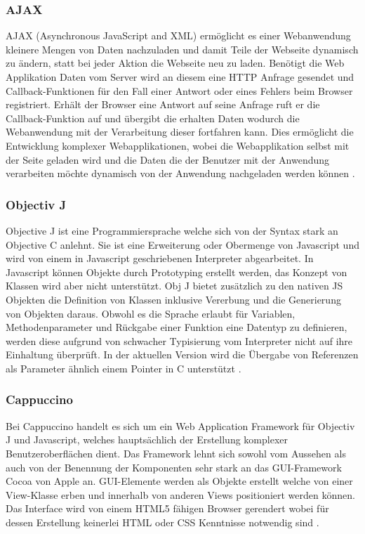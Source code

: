 \subsubsection{AJAX}
\label{sec:AJAX}
AJAX (Asynchronous JavaScript and XML) ermöglicht es einer Webanwendung kleinere Mengen von Daten nachzuladen und damit Teile der Webseite dynamisch zu ändern, 
statt bei jeder Aktion die Webseite neu zu laden.
Benötigt die Web Applikation Daten vom Server wird an diesem eine HTTP Anfrage gesendet und Callback-Funktionen für den Fall einer Antwort oder eines Fehlers beim Browser registriert.
Erhält der Browser eine Antwort auf seine Anfrage ruft er die Callback-Funktion auf und übergibt die erhalten Daten wodurch die Webanwendung mit der Verarbeitung dieser fortfahren kann.
Dies ermöglicht die Entwicklung komplexer Webapplikationen, 
wobei die Webapplikation selbst mit der Seite geladen wird und die Daten die der Benutzer mit der Anwendung verarbeiten möchte dynamisch von der Anwendung nachgeladen werden können \cite{ajax}.

\subsubsection{Objectiv J}
\label{sec:Objectiv J}

Objective J ist eine Programmiersprache welche sich von der Syntax stark an Objective C anlehnt.
Sie ist eine Erweiterung oder Obermenge von Javascript und wird von einem in Javascript geschriebenen Interpreter abgearbeitet.
In Javascript können Objekte durch Prototyping erstellt werden, das Konzept von Klassen wird aber nicht unterstützt.
Obj J bietet zusätzlich zu den nativen JS Objekten die Definition von Klassen inklusive Vererbung und die Generierung von Objekten daraus.
Obwohl es die Sprache erlaubt für Variablen, Methodenparameter und Rückgabe einer Funktion eine Datentyp zu definieren, 
werden diese aufgrund von schwacher Typisierung vom Interpreter nicht auf ihre Einhaltung überprüft.
In der aktuellen Version wird die Übergabe von Referenzen als Parameter ähnlich einem Pointer in C unterstützt \cite{capp}.

\subsubsection{Cappuccino}
\label{sec:Cappuccino}
Bei Cappuccino handelt es sich um ein Web Application Framework für Objectiv J und Javascript, welches hauptsächlich der Erstellung komplexer Benutzeroberflächen dient.
Das Framework lehnt sich sowohl vom Aussehen als auch von der Benennung der Komponenten sehr stark an das GUI-Framework Cocoa von Apple an.
GUI-Elemente werden als Objekte erstellt welche von einer View-Klasse erben und innerhalb von anderen Views positioniert werden können.
Das Interface wird von einem HTML5 fähigen Browser gerendert wobei für dessen Erstellung keinerlei HTML oder CSS Kenntnisse notwendig sind \cite{capp}.


